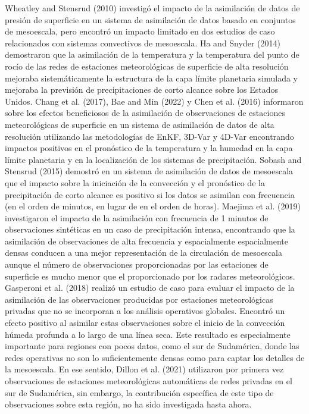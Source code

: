 \documentclass[12pt,twoside]{reedthesis}
\begin{document}
Wheatley and Stensrud (2010) investigó el impacto de la asimilación de datos de presión de superficie en un sistema de asimilación de datos basado en conjuntos de mesoescala, pero encontró un impacto limitado en dos estudios de caso relacionados con sistemas convectivos de mesoescala. Ha and Snyder (2014) demostraron que la asimilación de la temperatura y la temperatura del punto de rocío de las redes de estaciones meteorológicas de superficie de alta resolución mejoraba sistemáticamente la estructura de la capa límite planetaria simulada y mejoraba la previsión de precipitaciones de corto alcance sobre los Estados Unidos. Chang et al. (2017), Bae and Min (2022) y Chen et al. (2016) informaron sobre los efectos beneficiosos de la asimilación de observaciones de estaciones meteorológicas de superficie en un sistema de asimilación de datos de alta resolución utilizando las metodologías de EnKF, 3D-Var y 4D-Var encontrando impactos positivos en el pronóstico de la temperatura y la humedad en la capa límite planetaria y en la localización de los sistemas de precipitación. Sobash and Stensrud (2015) demostró en un sistema de asimilación de datos de mesoescala que el impacto sobre la iniciación de la convección y el pronóstico de la precipitación de corto alcance es positivo si los datos se asimilan con frecuencia (en el orden de minutos, en lugar de en el orden de horas). Maejima et al. (2019) investigaron el impacto de la asimilación con frecuencia de 1 minutos de observaciones sintéticas en un caso de precipitación intensa, encontrando que la asimilación de observaciones de alta frecuencia y espacialmente espacialmente densas conducen a una mejor representación de la circulación de mesoescala aunque el número de observaciones proporcionadas por las estaciones de superficie es mucho menor que el proporcionado por los radares meteorológicos. Gasperoni et al. (2018) realizó un estudio de caso para evaluar el impacto de la asimilación de las observaciones producidas por estaciones meteorológicas privadas que no se incorporan a los análisis operativos globales. Encontró un efecto positivo al asimilar estas observaciones sobre el inicio de la convección húmeda profunda a lo largo de una línea seca. Este resultado es especialmente importante para regiones con pocos datos, como el sur de Sudamérica, donde las redes operativas no son lo suficientemente densas como para captar los detalles de la mesoescala. En ese sentido, Dillon et al. (2021) utilizaron por primera vez observaciones de estaciones meteorológicas automáticas de redes privadas en el sur de Sudamérica, sin embargo, la contribución específica de este tipo de observaciones sobre esta región, no ha sido investigada hasta ahora.
\end{document}
